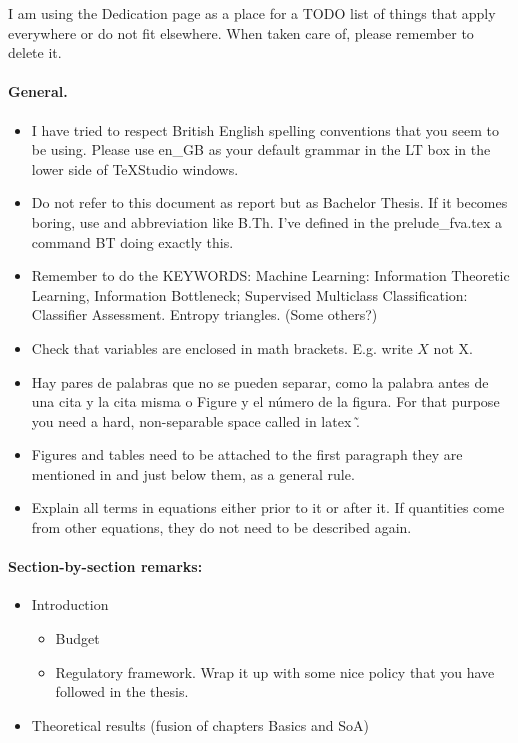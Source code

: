 {\color{red} %
I am using the Dedication page as a place for a TODO list of things that apply everywhere or do not fit elsewhere. When taken care of, please remember to delete it. 

\paragraph{General. }

\begin{itemize}

\item I have tried to  respect British English spelling conventions that you seem to be using. Please use en\_GB as your default grammar in the LT box in the lower side of TeXStudio windows. 

\item Do not refer to this document as report but as Bachelor Thesis. If it becomes boring, use and abbreviation like B.Th. I've defined in  the prelude\_fva.tex a command {}BT doing exactly this.

\item Remember to do the KEYWORDS: Machine Learning: Information Theoretic Learning, Information Bottleneck; Supervised Multiclass Classification: Classifier Assessment. Entropy triangles. (Some others?)

\item Check that variables are enclosed in math brackets. E.g. write $X$ not X.

\item Hay pares de palabras que no se pueden separar, como la palabra antes de una cita y la cita misma o Figure y el n\'umero de la figura. For that purpose you need a hard, non-separable space called in latex \~.

\item Figures and tables need to be attached to the first paragraph they are mentioned in and just below them, as a general rule. 

\item Explain all terms in equations either prior to it or after it. If quantities come from other equations, they do not need to be described again. 

\end{itemize}

\paragraph{Section-by-section remarks: }
\begin{itemize}
\item Introduction

\begin{itemize}
\item Budget

\item  Regulatory framework. Wrap it up with some nice policy that you have followed in the thesis. 
\end{itemize} 

\item Theoretical results (fusion of chapters Basics and SoA)



\end{itemize}
} %
